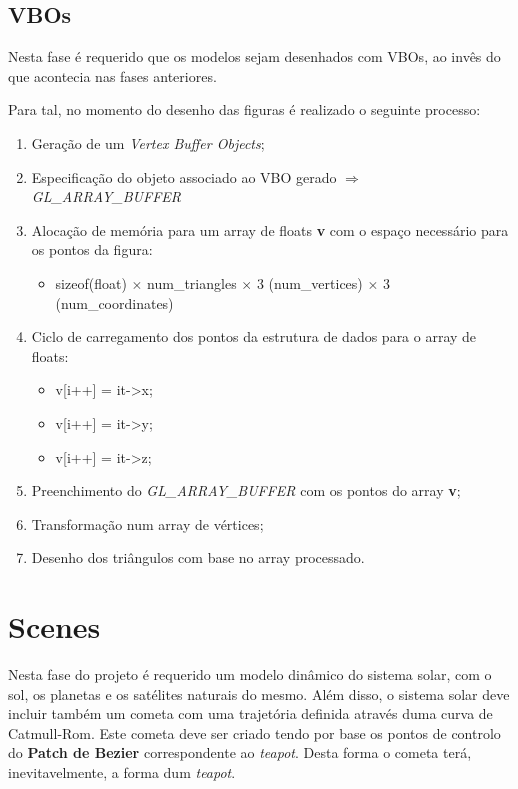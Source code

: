 \documentclass[a4paper]{article}
\begin{document}
\newpage

\subsection{VBOs}
\label{sec:vbos}

Nesta fase é requerido que os modelos sejam desenhados com VBOs, ao invês do que acontecia nas fases anteriores.

Para tal, no momento do desenho das figuras é realizado o seguinte processo:

\ttfamily
\begin{enumerate}
  \item Geração de um \textit{Vertex Buffer Objects};
  \item Especificação do objeto associado ao VBO gerado $\Rightarrow$ \textit{GL\_ARRAY\_BUFFER}
  \item Alocação de memória para um array de floats \textbf{v} com o espaço necessário para os pontos da figura:
    \begin{itemize}
      \item sizeof(float) $\times$ num\_triangles $\times$ 3 (num\_vertices) $\times$ 3 (num\_coordinates)
    \end{itemize}
  \item Ciclo de carregamento dos pontos da estrutura de dados para o array de floats:
    \begin{itemize}
      \item v[i++] = it->x;
      \item v[i++] = it->y;
      \item v[i++] = it->z;
    \end{itemize}
  \item Preenchimento do \textit{GL\_ARRAY\_BUFFER} com os pontos do array \textbf{v};
  \item Transformação num array de vértices;
  \item Desenho dos triângulos com base no array processado.
\end{enumerate}
\rmfamily


\newpage

\section{Scenes}
\label{sec:scenes}

Nesta fase do projeto é requerido um modelo dinâmico do sistema solar, com o sol, os planetas e os satélites naturais do mesmo. Além disso, o sistema solar deve incluir também um cometa com uma trajetória definida através duma curva de Catmull-Rom. Este cometa deve ser criado tendo por base os pontos de controlo do \textbf{Patch de Bezier} correspondente ao \textit{teapot}. Desta forma o cometa terá, inevitavelmente, a forma dum \textit{teapot}.
\end{document}
